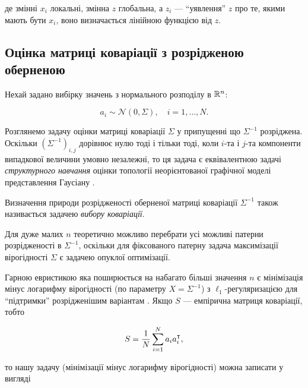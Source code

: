 де змінні $x_i$ локальні, змінна $z$ глобальна, а $z_i$ --- ``уявлення'' $z$ про те, якими мають бути $x_i$, воно визначається лінійною функцією від $z$. 

\subsection{Оцінка матриці коваріації з розрідженою оберненою}

Нехай задано вибірку значень з нормального розподілу в $\mathbb{R}^n$:

\begin{equation}
    a_i \sim \mathcal{N}(0, \Sigma), \quad i = 1, \ldots, N.
\end{equation}

Розглянемо задачу оцінки матриці коваріації $\Sigma$ у припущенні що $\Sigma^{-1}$ розріджена. Оскільки $\left(\Sigma^{-1}\right)_{i,j}$ дорівнює нулю тоді і тільки тоді, коли $i$-та і $j$-та компоненти випадкової величини умовно незалежні, то ця задача є еквівалентною задачі \textit{структурного навчання} оцінки топології неорієнтованої графічної моделі представлення Гаусіану \cite{104}. 

\begin{definition}
    Визначення природи розрідженості оберненої матриці коваріації $\Sigma^{-1}$ також називається задачею \textit{вибору коваріації}.
\end{definition}

\begin{remark}
    Для дуже малих $n$ теоретично можливо перебрати усі можливі патерни розрідженості в $\Sigma^{-1}$, оскільки для фіксованого патерну задача максимізації вірогідності $\Sigma$ є задачею опуклої оптимізації.
\end{remark}

Гарною евристикою яка поширюється на набагато більші значення $n$ є мінімізація мінус логарифму вірогідності (по параметру $X = \Sigma^{-1}$) з $\ell_1$-регуляризацією для ``підтримки'' розрідженішим варіантам \cite{7}. Якщо $S$ --- емпірична матриця коваріації, тобто

\begin{equation}
    S = \frac{1}{N} \operatorname*{\sum}_{i = 1}^N a_i a_i^\intercal,
\end{equation}

то нашу задачу (мінімізації мінус логарифму вірогідності) можна записати у вигляді

